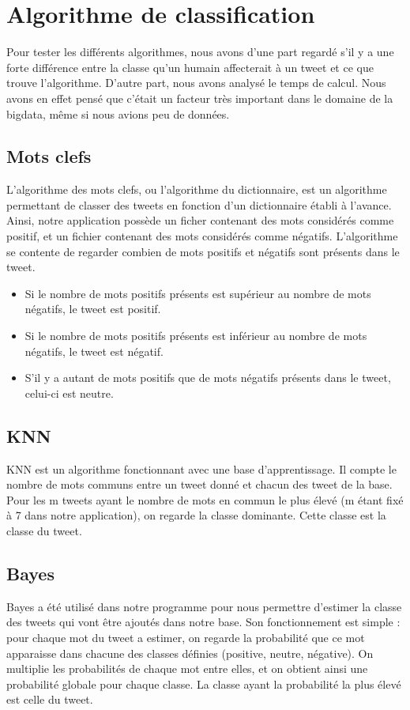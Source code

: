 \documentclass[a4paper,10pt]{report}
\begin{document}
  \section{Algorithme de classification}
    Pour tester les différents algorithmes, nous avons d'une part regardé s'il y a une forte différence entre la classe qu'un
    humain affecterait à un tweet et ce que trouve l'algorithme.
    D'autre part, nous avons analysé le temps de calcul. Nous avons en effet pensé que c'était un facteur
    très important dans le domaine de la bigdata, même si nous avions peu de données.
     
    \subsection{Mots clefs}
      L'algorithme des mots clefs, ou l'algorithme du dictionnaire, est un algorithme permettant de classer des tweets en fonction d'un dictionnaire établi à l'avance.
      Ainsi, notre application possède un ficher contenant des mots considérés comme positif, et un fichier contenant des mots considérés comme négatifs.
      L'algorithme se contente de regarder combien de mots positifs et négatifs sont présents dans le tweet.
      \begin{itemize}
       \item Si le nombre de mots positifs présents est supérieur au nombre de mots négatifs, le tweet est positif.
       \item Si le nombre de mots positifs présents est inférieur au nombre de mots négatifs, le tweet est négatif.
       \item S'il y a autant de mots positifs que de mots négatifs présents dans le tweet, celui-ci est neutre.
      \end{itemize}

    \subsection{KNN}
      KNN est un algorithme fonctionnant avec une base d'apprentissage. Il compte le nombre de mots communs entre un tweet donné et chacun des tweet de la base.
      Pour les m tweets ayant le nombre de mots en commun le plus élevé (m étant fixé à 7 dans notre application), on regarde la classe dominante.
      Cette classe est la classe du tweet.
      
    \subsection{Bayes}
      Bayes a été utilisé dans notre programme pour nous permettre d'estimer la classe des tweets qui vont être ajoutés dans notre base.
      Son fonctionnement est simple : pour chaque mot du tweet a estimer, on regarde la probabilité que ce mot apparaisse dans chacune des classes définies (positive, neutre, négative).
      On multiplie les probabilités de chaque mot entre elles, et on obtient ainsi une probabilité globale pour chaque classe.
      La classe ayant la probabilité la plus élevé est celle du tweet.
      \newline\newline
      
\end{document}
